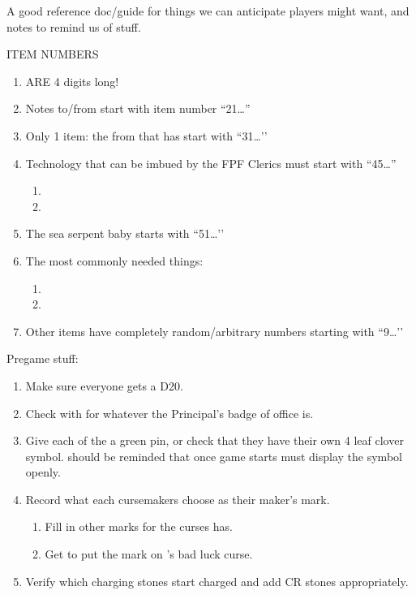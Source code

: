 \documentclass[green]{GL2020}
\begin{document}
\name{\gGMGuide{}}

A good reference doc/guide for things we can anticipate players might want, and notes to remind us of stuff.

{\large ITEM NUMBERS}
\begin{enumerate}
	\item ARE 4 digits long!
	\item Notes to/from \cChupInventor{} start with item number ``21\ldots ''
	\item Only 1 item: the \iFolderOfNotes{} from \cBunker{} that \cDisney{} has start with ``31\ldots ’’
	\item Technology that can be imbued by the FPF Clerics must start with ``45\ldots ''
	\begin{enumerate}
		\item \iMagicMusicBox{}
		\item \iVidCom{}
	\end{enumerate}
	\item The sea serpent baby starts with ``51…’’
	\item The most commonly needed things:
	\begin{enumerate}
		\item \iRitualCandle{}
		\item \iGlassVial{}
	\end{enumerate}
	\item Other items have completely random/arbitrary numbers starting with ``9\ldots ’’
\end{enumerate}

{\large Pregame stuff:}
\begin{enumerate}
	\item Make sure everyone gets a D20.
	\item Check with \cPrincipal{\MYplayer} for whatever the Principal's badge of office is.
	\item Give each of the \pGoaties{} a green pin, or check that they have their own 4 leaf clover symbol. \cChupAvenger{\MYplayer} should be reminded that once game starts \cChupAvenger{\they} must display the symbol openly.
	\item Record what each cursemakers choose as their maker’s mark.
	\begin{enumerate}
		\item Fill in other marks for the curses \cHedonist{\MYplayer} has.
		\item Get \cPrince{\MYplayer} to put the mark on \cInitiate{\MYplayer}’s bad luck curse.
	\end{enumerate}
	\item Verify which charging stones start charged and add CR stones appropriately.
\end{enumerate}
\end{document}
